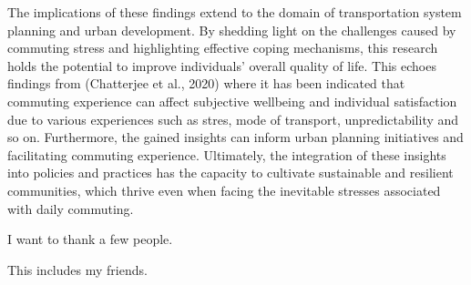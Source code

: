 \documentclass[
11pt, %
oneside, %
english, %
singlespacing, %
]{macthesis} %
\def\blankpage{%
      \clearpage%
      \thispagestyle{empty}%
      \addtocounter{page}{-1}%
      \null%
      \clearpage}
\begin{document}
The implications of these findings extend to the domain of transportation system planning and urban development. By shedding light on the challenges caused by commuting stress and highlighting effective coping mechanisms, this research holds the potential to improve individuals' overall quality of life. This echoes findings from (Chatterjee et al., 2020) where it has been indicated that commuting experience can affect subjective wellbeing and individual satisfaction due to various experiences such as stres, mode of transport, unpredictability and so on.
Furthermore, the gained insights can inform urban planning initiatives and facilitating commuting experience. Ultimately, the integration of these insights into policies and practices has the capacity to cultivate sustainable and resilient communities, which thrive even when facing the inevitable stresses associated with daily commuting.
\blankpage
\clearpage

  \begin{acknowledgements}
  \addchaptertocentry{\acknowledgementname} %
    I want to thank a few people.

    This includes my friends.
  \end{acknowledgements}
\blankpage
\clearpage


\tableofcontents %

\listoffigures %

\listoftables %

\end{document}
